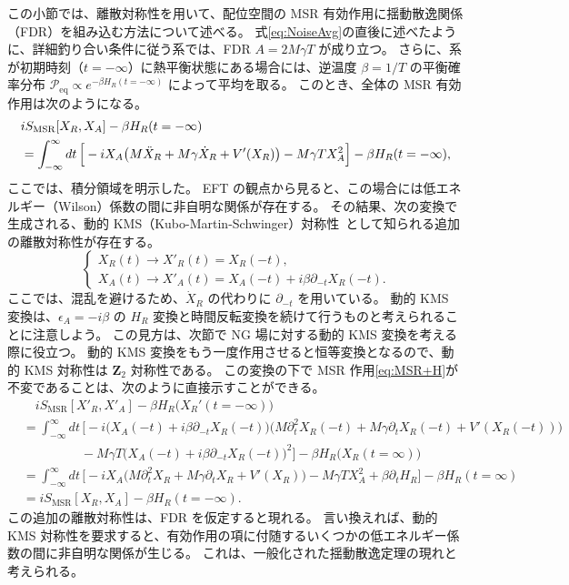 この小節では、離散対称性を用いて、配位空間の MSR 有効作用に揺動散逸関係（FDR）を組み込む方法について述べる。
式\eqref{eq:NoiseAvg}の直後に述べたように、詳細釣り合い条件に従う系では、FDR $A= 2M \gamma T$ が成り立つ。
さらに、系が初期時刻（$ t = - \infty$）に熱平衡状態にある場合には、逆温度 $\beta = 1/T$ の平衡確率分布 $\mathcal P_{\mathrm{eq}} \propto e^{- \beta H_R (t = - \infty)}$ によって平均を取る。
このとき、全体の MSR 有効作用は次のようになる。
\begin{align}
\nonumber
 &iS_{\rm MSR} [X_{R},X_{A}]  - \beta H_R (t=-\infty)
 \\
& = \int_{-\infty}^{\infty} dt\, 
 \Big[  -i X_A \big( M\ddot{X}_R + M \gamma\dot{X}_{R} + V'(X_{R})
 \big) - M \gamma T X_A^2 \Big] 
 - \beta H_R (t=-\infty), \label{eq:MSR+H}
\end{align}
ここでは、積分領域を明示した。
EFT の観点から見ると、この場合には低エネルギー（Wilson）係数の間に非自明な関係が存在する。
その結果、次の変換で生成される、動的 KMS（Kubo-Martin-Schwinger）対称性~\cite{Aron,Glorioso:2017fpd,Aron2,Sieberer:2015hba}として知られる追加の離散対称性が存在する。
\begin{equation}
 \begin{cases}
  X_R (t) \to X'_R (t) = X_R(-t) , \\
  X_A (t) \to X'_A (t) = X_A (-t) + i \beta \partial_{-t} X_R (-t).
 \end{cases}\label{dyn:KMS:x}
\end{equation}
ここでは、混乱を避けるため、$\dot{X}_R$ の代わりに $\partial_{-t}$ を用いている。
動的 KMS 変換は、$\epsilon_{A}=-i\beta$ の $H_R$ 変換と時間反転変換を続けて行うものと考えられることに注意しよう。
この見方は、次節で NG 場に対する動的 KMS 変換を考える際に役立つ。
動的 KMS 変換をもう一度作用させると恒等変換となるので、動的 KMS 対称性は $\bm{Z}_2$ 対称性である。
この変換の下で MSR 作用\eqref{eq:MSR+H}が不変であることは、次のように直接示すことができる。
\begin{equation}
 \begin{split}
  &\quad iS_{\textrm{MSR}} [X'_R,X'_A] - \beta H_R \big( X_R'(t=-\infty) \big) 
  \\
  &= \int_{-\infty}^{\infty} dt\, 
  \Big[ -i \big( X_A (-t) + i \beta \partial_{-t} X_R (-t) \big) 
  \big( M \partial_t^2 X_R (-t) + M\gamma \partial_t X_{R} (-t)+ V'(X_{R}(-t))
  \big)  \\
  &\hspace{55pt} 
  - M \gamma T \big( X_A (-t) + i \beta \partial_{-t} X_R (-t) \big)^2  \Big] 
  - \beta H_R \big( X_R(t=\infty) \big)
  \\
  &= \int_{-\infty}^{\infty} dt\, 
  \Big[  -i  X_A  
  \big( M \partial_t^2 X_R  + M \gamma \partial_t X_{R} + V'(X_{R}) \big)  
  - M \gamma T  X_A^2  
  + \beta \partial_t H_R \Big] 
  - \beta H_R ( t=\infty )
  \\
  &= iS_{\mathrm{MSR}} [X_R,X_A] - \beta H_R (t= -\infty).
 \end{split} 
\end{equation}
この追加の離散対称性は、FDR を仮定すると現れる。
言い換えれば、動的 KMS 対称性を要求すると、有効作用の項に付随するいくつかの低エネルギー係数の間に非自明な関係が生じる。
これは、一般化された揺動散逸定理の現れと考えられる。




